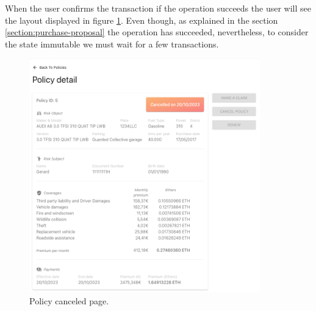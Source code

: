 {When the user confirms the transaction if the operation succeeds the user will see the layout displayed in figure \ref{fig:policy-canceled}. Even though, as explained in the section \ref{section:purchase-proposal} the operation has succeeded, nevertheless, to consider the state immutable we must wait for a few transactions.

\begin{figure}[H]
\centering
\includegraphics[width=10cm]{img/results/policy-canceled.png}
\caption[Insurechain: Policy canceled page]{\footnotesize{Policy canceled page.}}
\label{fig:policy-canceled}
\end{figure}
}